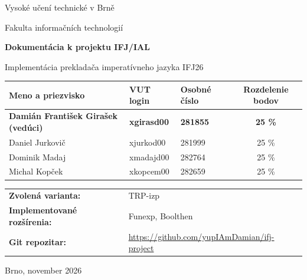 \documentclass[11pt, a4paper]{article}
\begin{document}
\begin{titlepage}
    \centering
    {\Large Vysoké učení technické v Brně \par}
    {\large Fakulta informačních technologií \par}
    \vspace{1.5cm}
    
    {\Huge \bfseries Dokumentácia k projektu IFJ/IAL \par}
    \vspace{0.4cm}
    {\Large Implementácia prekladača imperatívneho jazyka IFJ26 \par}
    \vspace{1.5cm}

    \begin{table}[h]
        \centering
        \renewcommand{\arraystretch}{1.3}
        \begin{tabular}{@{} l l l c @{}}
            \toprule
            \textbf{Meno a priezvisko} & \textbf{VUT login} & \textbf{Osobné číslo} & \textbf{Rozdelenie bodov} \\
            \midrule
            \textbf{Damián František Girašek (vedúci)} & \textbf{xgirasd00} & \textbf{281855} & \textbf{25 \%} \\
            Daniel Jurkovič & xjurkod00 & 281999 & 25 \% \\
            Dominik Madaj & xmadajd00 & 282764 & 25 \% \\
            Michal Kopček & xkopcem00 & 282659 & 25 \% \\
            \bottomrule
        \end{tabular}
    \end{table}

    \vspace{1cm}

    \begin{flushleft}
        \renewcommand{\arraystretch}{1.4}
        \begin{tabular}{@{} l l @{}}
            \textbf{Zvolená varianta:} & TRP-izp \quad\\
            \textbf{Implementované rozšírenia:} & Funexp, Boolthen \quad\\
            \textbf{Git repozitar:} & \url{https://github.com/yupIAmDamian/ifj-project} \\
        \end{tabular}
    \end{flushleft}

    \vfill
    {\large Brno, november 2026 \par}
\end{titlepage}
\end{document}
